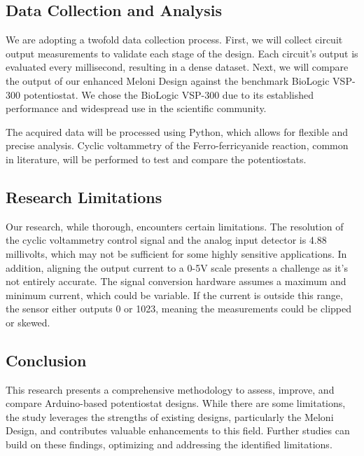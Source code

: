 \documentclass{article}
\begin{document}
\subsection*{Data Collection and Analysis}
We are adopting a twofold data collection process. First, we will collect circuit output measurements to validate each stage of the design. Each circuit’s output is evaluated every millisecond, resulting in a dense dataset. Next, we will compare the output of our enhanced Meloni Design against the benchmark BioLogic VSP-300 potentiostat. We chose the BioLogic VSP-300 due to its established performance and widespread use in the scientific community.

The acquired data will be processed using Python, which allows for flexible and precise analysis. Cyclic voltammetry of the Ferro-ferricyanide reaction, common in literature, will be performed to test and compare the potentiostats.

\subsection*{Research Limitations}
Our research, while thorough, encounters certain limitations. The resolution of the cyclic voltammetry control signal and the analog input detector is 4.88 millivolts, which may not be sufficient for some highly sensitive applications. In addition, aligning the output current to a 0-5V scale presents a challenge as it's not entirely accurate. The signal conversion hardware assumes a maximum and minimum current, which could be variable. If the current is outside this range, the sensor either outputs 0 or 1023, meaning the measurements could be clipped or skewed.

\subsection*{Conclusion}
This research presents a comprehensive methodology to assess, improve, and compare Arduino-based potentiostat designs. While there are some limitations, the study leverages the strengths of existing designs, particularly the Meloni Design, and contributes valuable enhancements to this field. Further studies can build on these findings, optimizing and addressing the identified limitations.
\end{document}
